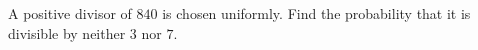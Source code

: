 A positive divisor of $840$ is chosen uniformly. Find the probability that it is divisible by neither $3$ nor $7$.
